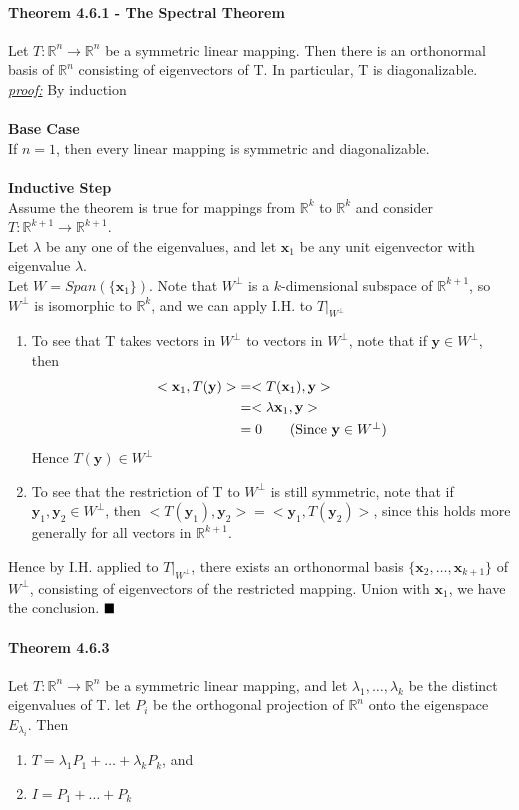\documentclass[11pt]{article}
\newcommand{\tb}[1]{\textbf{#1}}
\newcommand{\proof}[0]{\textit{\underline{proof:} }}
\newcommand{\qed}[0]{$\hfill\blacksquare$}
\newcommand{\real}[0]{\mathbb{R}}
\newcommand{\vx}[0]{\tb{x}}
\newcommand{\vy}[0]{\tb{y}}
\begin{document}
{\paragraph{Theorem 4.6.1 - The Spectral Theorem} Let $T: \real^n \rightarrow \real^n$ be a symmetric linear mapping. Then there is an orthonormal basis of $\real^n$ consisting of eigenvectors of T. In particular, T is diagonalizable.\\
\proof By induction\\\\
\tb{Base Case}\\
If $n=1$, then every linear mapping is symmetric and diagonalizable.\\\\
\tb{Inductive Step}\\
Assume the theorem is true for mappings from $\real^k$ to $\real^k$ and consider $T: \real^{k+1} \rightarrow \real^{k+1}$. \\
Let $\lambda$ be any one of the eigenvalues, and let $\vx_1$ be any unit eigenvector with eigenvalue $\lambda$.\\
Let $W = Span(\{\vx_1\})$. Note that $W^\perp$ is a $k$-dimensional subspace of $\real^{k+1}$, so $W^\perp$ is isomorphic to $\real^k$, and we can apply I.H. to $T|_{W^\perp}$
\begin{enumerate}
	\item To see that T takes vectors in $W^\perp$ to vectors in $W^\perp$, note that if $\vy \in W^\perp$, then
	\begin{align*}
		<\vx_1,T(\vy)> &= <T(\vx_1),\vy> \\
		&=<\lambda\vx_1,\vy> \\
		&= 0 \tag{Since $\vy \in W^\perp$}\\
	\end{align*}
	Hence $T(\vy) \in W^\perp$
	\item To see that the restriction of T to $W^\perp$ is still symmetric, note that if $\vy_1, \vy_2 \in W^\perp$, then $<T(\vy_1),\vy_2> = <\vy_1, T(\vy_2)>$, since this holds more generally for all vectors in $\real^{k+1}$.
\end{enumerate}
Hence by I.H. applied to $T|_{W^\perp}$, there exists an orthonormal basis $\{\vx_2,\hdots,\vx_{k+1}\}$ of $W^\perp$, consisting of eigenvectors of the restricted mapping. Union with $\vx_1$, we have the conclusion. \qed

\paragraph{Theorem 4.6.3} Let $T: \real^n \rightarrow \real^n$ be a symmetric linear mapping, and let $\lambda_1,\hdots,\lambda_k$ be the distinct eigenvalues of T. let $P_i$ be the orthogonal projection of $\real^n$ onto the eigenspace $E_{\lambda_i}$. Then
\begin{enumerate}
	\item $T = \lambda_1P_1 + \hdots + \lambda_kP_k$, and
	\item $I = P_1 + \hdots + P_k$
\end{enumerate}
}
\end{document}
